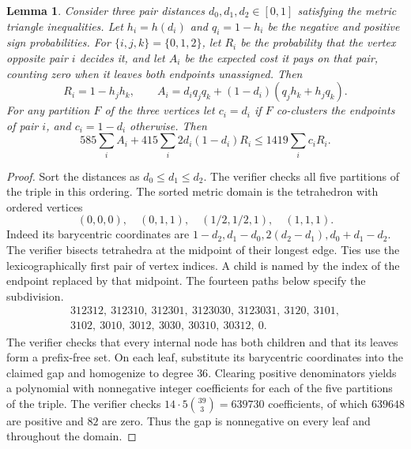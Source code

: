 \documentclass[11pt]{article}
\newtheorem{lemma}[theorem]{Lemma}
\begin{document}
\begin{lemma}\label{floor:triangle}
Consider three pair distances $d_0,d_1,d_2\in[0,1]$ satisfying the metric
triangle inequalities. Let $h_i=h(d_i)$ and $q_i=1-h_i$ be the
negative and positive sign probabilities. For $\{i,j,k\}=\{0,1,2\}$,
let $R_i$ be the probability that the vertex opposite pair $i$
decides it, and let $A_i$ be the expected cost it pays on that pair,
counting zero when it leaves both endpoints unassigned. Then
\[
 R_i=1-h_jh_k,\qquad
 A_i=d_iq_jq_k+(1-d_i)(q_jh_k+h_jq_k).
\]
For any partition $F$ of the three vertices let $c_i=d_i$ if
$F$ co-clusters the endpoints of pair $i$, and $c_i=1-d_i$ otherwise.  Then
\[
 585\sum_i A_i+415\sum_i2d_i(1-d_i)R_i
 \le1419\sum_i c_iR_i.
\]
\end{lemma}
\begin{proof}
Sort the distances as $d_0\le d_1\le d_2$. The verifier checks all five partitions
of the triple in this ordering.  The sorted metric domain is the
tetrahedron with ordered vertices
\[
 (0,0,0),\quad(0,1,1),\quad(1/2,1/2,1),\quad(1,1,1).
\]
Indeed its barycentric coordinates are
$1-d_2,d_1-d_0,2(d_2-d_1),d_0+d_1-d_2$.
The verifier bisects tetrahedra at the midpoint of their longest edge. Ties use the
lexicographically first pair of vertex indices.  A child
is named by the index of the endpoint replaced by that midpoint.
The fourteen paths below specify the subdivision.
\[
\begin{gathered}
312312,\ 312310,\ 312301,\ 3123030,\ 3123031,\ 3120,\ 3101,\\
3102,\ 3010,\ 3012,\ 3030,\ 30310,\ 30312,\ 0.
\end{gathered}
\]
The verifier checks that every internal node has both children
and that its leaves form a prefix-free set.  On each leaf, substitute its
barycentric coordinates into the claimed gap and homogenize to degree
$36$.  Clearing positive denominators yields a polynomial with
nonnegative integer coefficients for each of the five partitions
of the triple. The verifier checks $14\cdot5\binom{39}{3}=639730$
coefficients, of which $639648$ are positive and $82$ are zero. Thus the gap
is nonnegative on every leaf and throughout the domain.
\end{proof}
\end{document}
